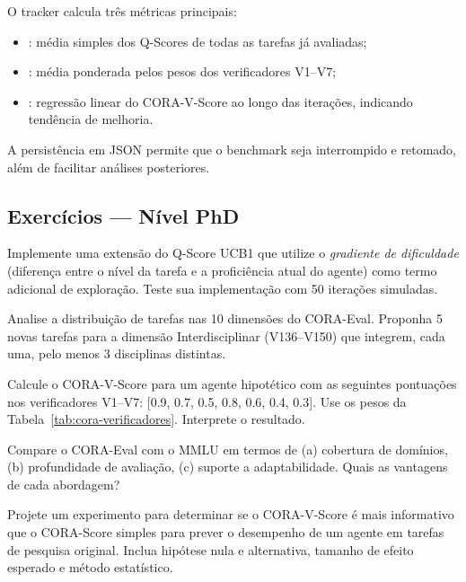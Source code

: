 O tracker calcula três métricas principais:
\begin{itemize}
\item {}: média simples dos Q-Scores de todas as
tarefas já avaliadas;
\item {}: média ponderada pelos pesos dos
verificadores V1--V7;
\item {}: regressão linear do
CORA-V-Score ao longo das iterações, indicando tendência de melhoria.
\end{itemize}

A persistência em JSON permite que o benchmark seja interrompido e
retomado, além de facilitar análises posteriores.

\subsection{Exercícios — Nível PhD}

\begin{exercicio}
Implemente uma extensão do Q-Score UCB1 que utilize o
\textit{gradiente de dificuldade} (diferença entre o nível da tarefa
e a proficiência atual do agente) como termo adicional de exploração.
Teste sua implementação com 50 iterações simuladas.
\end{exercicio}

\begin{exercicio}
Analise a distribuição de tarefas nas 10 dimensões do CORA-Eval.
Proponha 5 novas tarefas para a dimensão Interdisciplinar (V136--V150)
que integrem, cada uma, pelo menos 3 disciplinas distintas.
\end{exercicio}

\begin{exercicio}
Calcule o CORA-V-Score para um agente hipotético com as seguintes
pontuações nos verificadores V1--V7: [0.9, 0.7, 0.5, 0.8, 0.6, 0.4, 0.3].
Use os pesos da Tabela~\ref{tab:cora-verificadores}. Interprete o
resultado.
\end{exercicio}

\begin{exercicio}
Compare o CORA-Eval com o MMLU \cite{hendrycks2021measuring} em
termos de (a) cobertura de domínios, (b) profundidade de avaliação,
(c) suporte a adaptabilidade. Quais as vantagens de cada abordagem?
\end{exercicio}

\begin{exercicio}
Projete um experimento para determinar se o CORA-V-Score é mais
informativo que o CORA-Score simples para prever o desempenho de um
agente em tarefas de pesquisa original. Inclua hipótese nula e
alternativa, tamanho de efeito esperado e método estatístico.
\end{exercicio}

